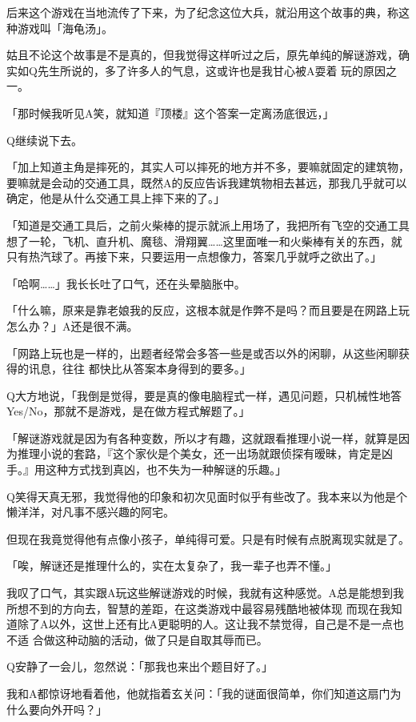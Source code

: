 \documentclass{article}
\begin{document}
后来这个游戏在当地流传了下来，为了纪念这位大兵，就沿用这个故事的典，称这种游戏叫「海龟汤」。 

姑且不论这个故事是不是真的，但我觉得这样听过之后，原先单纯的解谜游戏，确实如Q先生所说的，多了许多人的气息，这或许也是我甘心被A耍着
\newpage
玩的原因之一。 

「那时候我听见A笑，就知道『顶楼』这个答案一定离汤底很远，」 

Q继续说下去。 

「加上知道主角是摔死的，其实人可以摔死的地方并不多，要嘛就固定的建筑物，要嘛就是会动的交通工具，既然A的反应告诉我建筑物相去甚远，那我几乎就可以确定，他是从什么交通工具上摔下来的了。」 

「知道是交通工具后，之前火柴棒的提示就派上用场了，我把所有飞空的交通工具想了一轮，飞机、直升机、魔毯、滑翔翼……这里面唯一和火柴棒有关的东西，就只有热汽球了。再接下来，只要运用一点想像力，答案几乎就呼之欲出了。」 

「哈啊……」我长长吐了口气，还在头晕脑胀中。 

「什么嘛，原来是靠老娘我的反应，这根本就是作弊不是吗？而且要是在网路上玩怎么办？」A还是很不满。 

「网路上玩也是一样的，出题者经常会多答一些是或否以外的闲聊，从这些闲聊获得的讯息，往往
\newpage
都快比从答案本身得到的要多。」 

Q大方地说，「我倒是觉得，要是真的像电脑程式一样，遇见问题，只机械性地答Yes/No，那就不是游戏，是在做方程式解题了。」 

「解谜游戏就是因为有各种变数，所以才有趣，这就跟看推理小说一样，就算是因为推理小说的套路，『这个家伙是个美女，还一出场就跟侦探有暧昧，肯定是凶手。』用这种方式找到真凶，也不失为一种解谜的乐趣。」 

Q笑得天真无邪，我觉得他的印象和初次见面时似乎有些改了。我本来以为他是个懒洋洋，对凡事不感兴趣的阿宅。 

但现在我竟觉得他有点像小孩子，单纯得可爱。只是有时候有点脱离现实就是了。 

「唉，解谜还是推理什么的，实在太复杂了，我一辈子也弄不懂。」 

我叹了口气，其实跟A玩这些解谜游戏的时候，我就有这种感觉。A总是能想到我所想不到的方向去，智慧的差距，在这类游戏中最容易残酷地被体现
而现在我知道除了A以外，这世上还有比A更聪明的人。这让我不禁觉得，自己是不是一点也不适
\newpage
合做这种动脑的活动，做了只是自取其辱而已。 

Q安静了一会儿，忽然说：「那我也来出个题目好了。」 

我和A都惊讶地看着他，他就指着玄关问：「我的谜面很简单，你们知道这扇门为什么要向外开吗？」 
\end{document}

